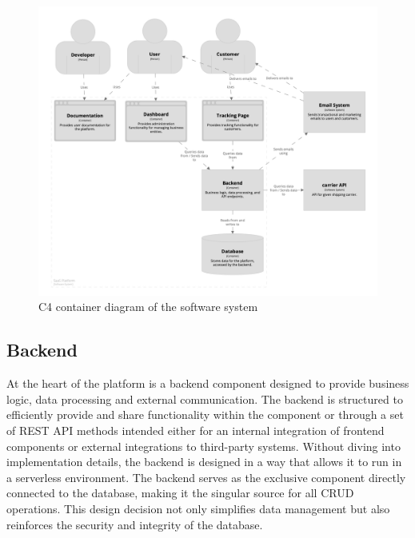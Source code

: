 \begin{figure}[p]\centering
\includegraphics[width=140mm]{img/chap03/fig_architecture.png}
\caption{C4 container diagram of the software system}
\label{img03:c4_container_diagram_software_sytem}
\end{figure}

\subsection{Backend}
\label{subsec:backend}
At the heart of the platform is a backend component designed to provide business logic, data processing and external communication.
The backend is structured to efficiently provide and share functionality within the component or through a set of REST API methods intended either for an internal integration of frontend components or external integrations to third-party systems.
Without diving into implementation details, the backend is designed in a way that allows it to run in a serverless environment.
The backend serves as the exclusive component directly connected to the database, making it the singular source for all \ac{CRUD} operations.
This design decision not only simplifies data management but also reinforces the security and integrity of the database.

